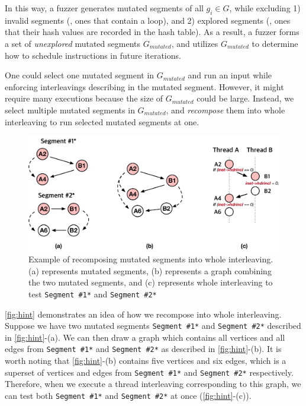 In this way, a fuzzer generates mutated segments of all $g_i \in G$,
while excluding 1) invalid segments (\ie, ones that contain a loop),
and 2) explored segments (\ie, ones that their hash values are
recorded in the hash table).
%
As a result, a fuzzer forms a set of \textit{unexplored} mutated
segments $G_{mutated}$, and utilizes $G_{mutated}$ to determine how to
schedule instructions in future iterations.





%
One could select one mutated segment in $G_{mutated}$ and run an input
while enforcing interleavings describing in the mutated segment.
%
However, it might require many executions because the size of
$G_{mutated}$ could be large.
%
Instead, we select multiple mutated segments in $G_{mutated}$, and
\textit{recompose} them into whole interleaving to run selected
mutated segments at one.



\begin{figure}[t]
  \centering
  \includegraphics[width=0.85\linewidth]{fig/hint.pdf}
  \caption{Example of recomposing mutated segments into whole
    interleaving. (a) represents mutated segments, (b) represents a
    graph combining the two mutated segments, and (c) represents whole
    interleaving to test \texttt{Segment \#1*} and \texttt{Segment
      \#2*}}
  \label{fig:hint}
\end{figure}



\autoref{fig:hint} demonstrates an idea of how we recompose into whole
interleaving. Suppose we have two mutated segments \texttt{Segment
  \#1*} and \texttt{Segment \#2*} described in \autoref{fig:hint}-(a).
%
We can then draw a graph which contains all vertices and all edges
from \texttt{Segment \#1*} and \texttt{Segment \#2*} as described in
\autoref{fig:hint}-(b).
%
It is worth noting that \autoref{fig:hint}-(b) contains five vertices
and six edges, which is a superset of vertices and edges from
\texttt{Segment \#1*} and \texttt{Segment \#2*} respectively.
%
Therefore, when we execute a thread interleaving corresponding to this
graph, we can test both \texttt{Segment \#1*} and \texttt{Segment
  \#2*} at once (\autoref{fig:hint}-(c)).



